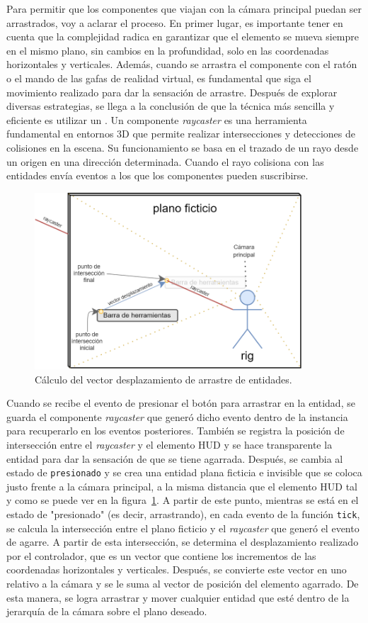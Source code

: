 \documentclass[a4paper, 11pt]{book}
\begin{document}
Para permitir que los componentes que viajan con la cámara principal puedan ser arrastrados, voy a aclarar el proceso. En primer lugar, es importante tener en cuenta que la complejidad radica en garantizar que el elemento se mueva siempre en el mismo plano, sin cambios en la profundidad, solo en las coordenadas horizontales y verticales.
Además, cuando se arrastra el componente con el ratón o el mando de las gafas de realidad virtual, es fundamental que siga el movimiento realizado para dar la sensación de arrastre.
Después de explorar diversas estrategias, se llega a la conclusión de que la técnica más sencilla y eficiente es utilizar un \emph{}. Un componente \emph{raycaster} es una herramienta fundamental en entornos \textsc{3D} que permite realizar intersecciones y detecciones de colisiones en la escena. Su funcionamiento se basa en el trazado de un rayo desde un origen en una dirección determinada. Cuando el rayo colisiona con las entidades envía eventos a los que los componentes pueden suscribirse.\\
\begin{figure}[h]
	\centering
	\includegraphics[width=10cm, keepaspectratio]{img/custom-draggable.png}
	\caption{Cálculo del vector desplazamiento de arrastre de entidades.}
	\label{fig:raycaster}
\end{figure}
Cuando se recibe el evento de presionar el botón para arrastrar en la entidad, se guarda el componente \emph{raycaster} que generó dicho evento dentro de la instancia para recuperarlo en los eventos posteriores. 
También se registra la posición de intersección entre el \emph{raycaster} y el elemento \textsc{\gls{HUD}} y se hace transparente la entidad para dar la sensación de que se tiene agarrada. Después, se cambia al estado de \texttt{presionado} y se crea una entidad plana ficticia e invisible que se coloca justo frente a la cámara principal, a la misma distancia que el elemento \textsc{\gls{HUD}} tal y como se puede ver en la figura~\ref{fig:raycaster}. A partir de este punto, mientras se está en el estado de "presionado" (es decir, arrastrando), en cada evento de la función \texttt{tick}, se calcula la intersección entre el plano ficticio y el \emph{raycaster} que generó el evento de agarre. A partir de esta intersección, se determina el desplazamiento realizado por el controlador, que es un vector que contiene los incrementos de las coordenadas horizontales y verticales. Después, se convierte este vector en uno relativo a la cámara y se le suma al vector de posición del elemento agarrado. De esta manera, se logra arrastrar y mover cualquier entidad que esté dentro de la jerarquía de la cámara sobre el plano deseado.
\end{document}

